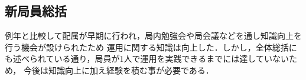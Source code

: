 \subsection*{新局員総括}

例年と比較して配属が早期に行われ，局内勉強会や局会議などを通し知識向上を行う機会が設けられたため
運用に関する知識は向上した．しかし，全体総括にも述べられている通り，局員が1人で運用を実践できるまでには達していないため，
今後は知識向上に加え経験を積む事が必要である．